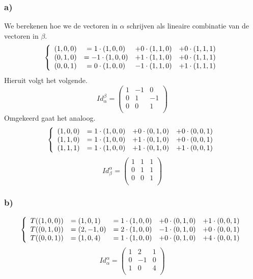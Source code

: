 \documentclass[lineaire_algebra_oplossingen.tex]{subfiles}
\begin{document}
\subsubsection*{a)}
We berekenen hoe we de vectoren in $\alpha$ schrijven als lineaire combinatie van de vectoren in $\beta$.
\[
\left\lbrace
\begin{array}{c c c c}
(1,0,0) &= 1\cdot (1,0,0) &+ 0\cdot (1,1,0) &+ 0\cdot (1,1,1)\\
(0,1,0) &= -1\cdot(1,0,0) &+ 1\cdot (1,1,0) &+ 0\cdot (1,1,1)\\
(0,0,1) &= 0\cdot(1,0,0) &-1\cdot (1,1,0) &+ 1\cdot (1,1,1)
\end{array}
\right.
\]
Hieruit volgt het volgende.
\[
Id_\alpha^\beta = 
\begin{pmatrix}
1 & -1 & 0\\
0 & 1 & -1\\
0 & 0 & 1\\
\end{pmatrix}
\]
Omgekeerd gaat het analoog.
\[
\left\lbrace
\begin{array}{c c c c}
(1,0,0) &= 1\cdot (1,0,0) &+ 0\cdot (0,1,0) &+ 0\cdot (0,0,1)\\
(1,1,0) &= 1\cdot (1,0,0) &+ 1\cdot (0,1,0) &+ 0\cdot (0,0,1)\\
(1,1,1) &= 1\cdot (1,0,0) &+ 1\cdot (0,1,0) &+ 1\cdot (0,0,1)
\end{array}
\right.
\]
\[
Id_\beta^\alpha = 
\begin{pmatrix}
1 & 1 & 1\\
0 & 1 & 1\\
0 & 0 & 1\\
\end{pmatrix}
\]
\subsubsection*{b)}
\[
\left\lbrace
\begin{array}{c l c c c}
T((1,0,0)) &= (1,0,1) &= 1\cdot (1,0,0) &+ 0\cdot (0,1,0) &+ 1\cdot (0,0,1) \\
T((0,1,0)) &= (2,-1,0)&= 2\cdot (1,0,0) &- 1\cdot (0,1,0) &+ 0\cdot (0,0,1)\\
T((0,0,1)) &= (1,0,4) &= 1\cdot (1,0,0) &+ 0\cdot (0,1,0) &+ 4\cdot (0,0,1)\\ 
\end{array}
\right.
\]
\[
Id_\alpha^\alpha = 
\begin{pmatrix}
1 & 2 & 1\\
0 & -1 & 0\\
1 & 0 & 4\\
\end{pmatrix}
\]
\end{document}
